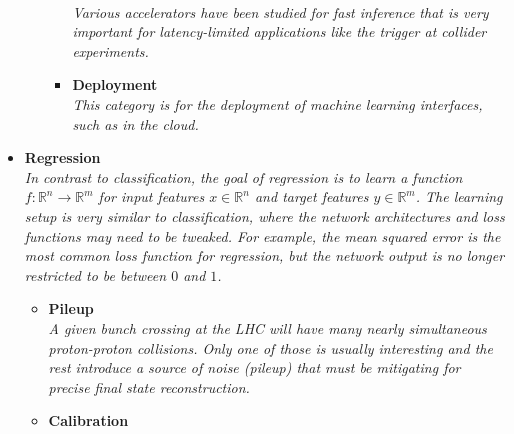 \documentclass[12pt,letterpaper]{article}
\begin{document}
\begin{itemize}
\begin{itemize}
\begin{itemize}
				\\\textit{Various accelerators have been studied for fast inference that is very important for latency-limited applications like the trigger at collider experiments.}
				\item \textbf{Deployment}~\cite{Li:2024uju,Bieringer:2024pzt,Savard:2023wwi,Holmberg:2023rfr,SunnebornGudnadottir:2021nhk,Kuznetsov:2020mcj}
				\\\textit{This category is for the deployment of machine learning interfaces, such as in the cloud.}
			\end{itemize}
	\end{itemize}
\item \textbf{Regression}
\\\textit{In contrast to classification, the goal of regression is to learn a function $f:\mathbb{R}^n\rightarrow\mathbb{R}^m$ for input features $x\in\mathbb{R}^n$ and target features $y\in\mathbb{R}^m$.  The learning setup is very similar to classification, where the network architectures and loss functions may need to be tweaked.  For example, the mean squared error is the most common loss function for regression, but the network output is no longer restricted to be between $0$ and $1$.}
	\begin{itemize}
		\item \textbf{Pileup}~\cite{Algren:2024bqw,Lieret:2023aqg,Kim:2023koz,CRESST:2022qor,Li:2022omf,Maier:2021ymx,Carrazza:2019efs,Martinez:2018fwc,ATL-PHYS-PUB-2019-028,Komiske:2017ubm}
		\\\textit{A given bunch crossing at the LHC will have many nearly simultaneous proton-proton collisions.  Only one of those is usually interesting and the rest introduce a source of noise (pileup) that must be mitigating for precise final state reconstruction.}
		\item \textbf{Calibration}~\cite{CMS:2024jdl,Akchurin:2024ffj,Britton:2024pdy,Hashmani:2024ykk,Zdybal:2024yzu,Kocot:2023izs,Acosta:2023nuw,Bein:2023ylt,Holmberg:2023rfr,Meyer:2023ffd,ALICETPC:2023ojd,ATLAS:2023tyv,Khozani:2023bql,Raine:2023fko,Soleymaninia:2023dds,Grosso:2023ltd,Grosso:2023jxp,Basak:2023wzq,Schwenker:2023bih,Lee:2023jew,Aad:2023ula,Guglielmi:2022ftj,Ge:2022xrv,Darulis:2022brn,Leigh:2022lpn,Valsecchi:2022rla,Gambhir:2022dut,Gambhir:2022gua,Akchurin:2022apq,Qiu:2022xvr,Alves:2022gnw,Dorigo:2022tfi,Chadeeva:2022kay,Pata:2022wam,Renteria-Estrada:2021zrd,Kronheim:2021hdb,Arratia:2021tsq,Micallef:2021src,Polson:2021kvr,Diefenthaler:2021rdj,Akchurin:2021ahx,Kieseler:2020wcq,Akchurin:2021afn,Pollard:2021fqv,Kieseler:2021jxc,Du:2020pmp,Baldi:2020hjm,Sirunyan:2019wwa,Kasieczka:2020vlh,Hooberman:DLPS2017,ATL-PHYS-PUB-2018-013,ATL-PHYS-PUB-2020-001,Cheong:2019upg}

\end{itemize}
\end{itemize}
\end{document}
